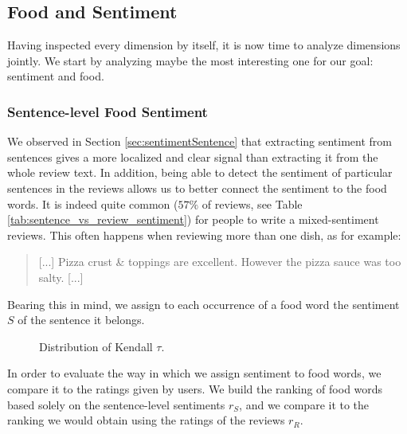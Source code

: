 \subsection{Food and Sentiment}
Having inspected every dimension by itself, it is now time to analyze dimensions jointly. We start by analyzing maybe the most interesting one for our goal: sentiment and food. 

\subsubsection{Sentence-level Food Sentiment}
We observed in Section \ref{sec:sentimentSentence} that extracting sentiment from sentences gives a more localized and clear signal than extracting it from the whole review text. 
In addition, being able to detect the sentiment of particular sentences in the reviews allows us to better connect the sentiment to the food words. 
It is indeed quite common ($57\%$ of reviews, see Table \ref{tab:sentence_vs_review_sentiment}) for people to write a mixed-sentiment reviews. This often happens when reviewing more than one dish, as for example:
\begin{quote}
	[...] Pizza crust \& toppings are excellent. However the pizza sauce was too salty. [...]
\end{quote}

Bearing this in mind, we assign to each occurrence of a food word the sentiment $S$ of the sentence it belongs.

\begin{figure}
\begin{center}
\caption{Distribution of Kendall $\tau$.}
\label{fig:kendall_tau_frequent_rounded}
\end{center}
\end{figure}

In order to evaluate the way in which we assign sentiment to food words, we compare it to the ratings given by users.
We build the ranking of food words based solely on the sentence-level sentiments $r_S$, and we compare it to the ranking we would obtain using the ratings of the reviews $r_R$. 

